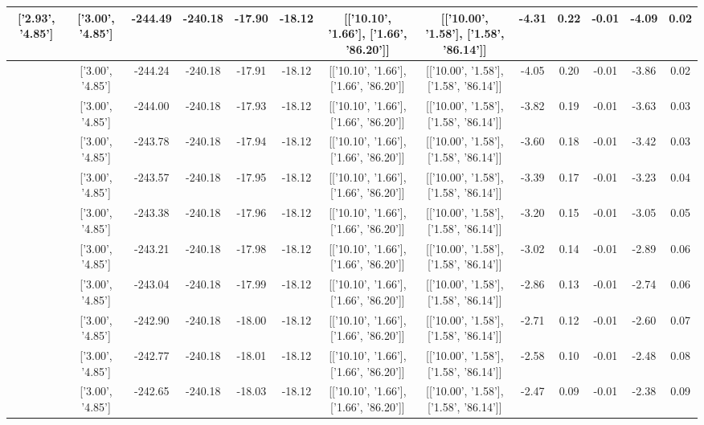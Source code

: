\begin{table}[htbp]
\begin{adjustbox}{angle=90}
\begin{tabular}{|c|c|c|c|c|c|c|c|c|c|c|c|c|}
 ['2.93', '4.85'] & ['3.00', '4.85'] & -244.49 & -240.18 & -17.90 & -18.12 & [['10.10', '1.66'], ['1.66', '86.20']] & [['10.00', '1.58'], ['1.58', '86.14']] & -4.31 & 0.22 & -0.01 & -4.09 & 0.02\\ \hline
 ['2.94', '4.85'] & ['3.00', '4.85'] & -244.24 & -240.18 & -17.91 & -18.12 & [['10.10', '1.66'], ['1.66', '86.20']] & [['10.00', '1.58'], ['1.58', '86.14']] & -4.05 & 0.20 & -0.01 & -3.86 & 0.02\\ \hline
 ['2.94', '4.85'] & ['3.00', '4.85'] & -244.00 & -240.18 & -17.93 & -18.12 & [['10.10', '1.66'], ['1.66', '86.20']] & [['10.00', '1.58'], ['1.58', '86.14']] & -3.82 & 0.19 & -0.01 & -3.63 & 0.03\\ \hline
 ['2.95', '4.85'] & ['3.00', '4.85'] & -243.78 & -240.18 & -17.94 & -18.12 & [['10.10', '1.66'], ['1.66', '86.20']] & [['10.00', '1.58'], ['1.58', '86.14']] & -3.60 & 0.18 & -0.01 & -3.42 & 0.03\\ \hline
 ['2.95', '4.85'] & ['3.00', '4.85'] & -243.57 & -240.18 & -17.95 & -18.12 & [['10.10', '1.66'], ['1.66', '86.20']] & [['10.00', '1.58'], ['1.58', '86.14']] & -3.39 & 0.17 & -0.01 & -3.23 & 0.04\\ \hline
 ['2.95', '4.85'] & ['3.00', '4.85'] & -243.38 & -240.18 & -17.96 & -18.12 & [['10.10', '1.66'], ['1.66', '86.20']] & [['10.00', '1.58'], ['1.58', '86.14']] & -3.20 & 0.15 & -0.01 & -3.05 & 0.05\\ \hline
 ['2.96', '4.85'] & ['3.00', '4.85'] & -243.21 & -240.18 & -17.98 & -18.12 & [['10.10', '1.66'], ['1.66', '86.20']] & [['10.00', '1.58'], ['1.58', '86.14']] & -3.02 & 0.14 & -0.01 & -2.89 & 0.06\\ \hline
 ['2.96', '4.85'] & ['3.00', '4.85'] & -243.04 & -240.18 & -17.99 & -18.12 & [['10.10', '1.66'], ['1.66', '86.20']] & [['10.00', '1.58'], ['1.58', '86.14']] & -2.86 & 0.13 & -0.01 & -2.74 & 0.06\\ \hline
 ['2.96', '4.85'] & ['3.00', '4.85'] & -242.90 & -240.18 & -18.00 & -18.12 & [['10.10', '1.66'], ['1.66', '86.20']] & [['10.00', '1.58'], ['1.58', '86.14']] & -2.71 & 0.12 & -0.01 & -2.60 & 0.07\\ \hline
 ['2.97', '4.85'] & ['3.00', '4.85'] & -242.77 & -240.18 & -18.01 & -18.12 & [['10.10', '1.66'], ['1.66', '86.20']] & [['10.00', '1.58'], ['1.58', '86.14']] & -2.58 & 0.10 & -0.01 & -2.48 & 0.08\\ \hline
 ['2.97', '4.85'] & ['3.00', '4.85'] & -242.65 & -240.18 & -18.03 & -18.12 & [['10.10', '1.66'], ['1.66', '86.20']] & [['10.00', '1.58'], ['1.58', '86.14']] & -2.47 & 0.09 & -0.01 & -2.38 & 0.09\\ \hline

\end{tabular}
\end{adjustbox}
\end{table}
